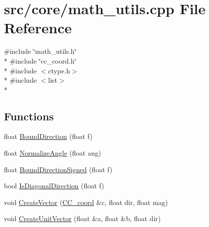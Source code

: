 \hypertarget{a00219}{\section{src/core/math\-\_\-utils.cpp File Reference}
\label{a00219}
}
{\ttfamily \#include \char`\"{}math\-\_\-utils.\-h\char`\"{}}\\*
{\ttfamily \#include \char`\"{}cc\-\_\-coord.\-h\char`\"{}}\\*
{\ttfamily \#include $<$ctype.\-h$>$}\\*
{\ttfamily \#include $<$list$>$}\\*
\subsection*{Functions}
\begin{DoxyCompactItemize}
\item 
float \hyperlink{a00219_a8de4d15d8fe0f9bb6b77a79fe70c3a0f}{Bound\-Direction} (float f)
\item 
float \hyperlink{a00219_ad38ca8535064a4237d1520b4d4a7b02f}{Normalize\-Angle} (float ang)
\item 
float \hyperlink{a00219_a1586ddb56dc59ae26381b6cda2e48121}{Bound\-Direction\-Signed} (float f)
\item 
bool \hyperlink{a00219_aac20f18810109b5fc4411e79f60b4709}{Is\-Diagonal\-Direction} (float f)
\item 
void \hyperlink{a00219_a13dd8bd63d1c19a47f72f0147782aa3f}{Create\-Vector} (\hyperlink{a00029}{C\-C\-\_\-coord} \&c, float dir, float mag)
\item 
void \hyperlink{a00219_a12be9b73b9dc3580491795559b3fd3ce}{Create\-Unit\-Vector} (float \&a, float \&b, float dir)
\end{DoxyCompactItemize}


